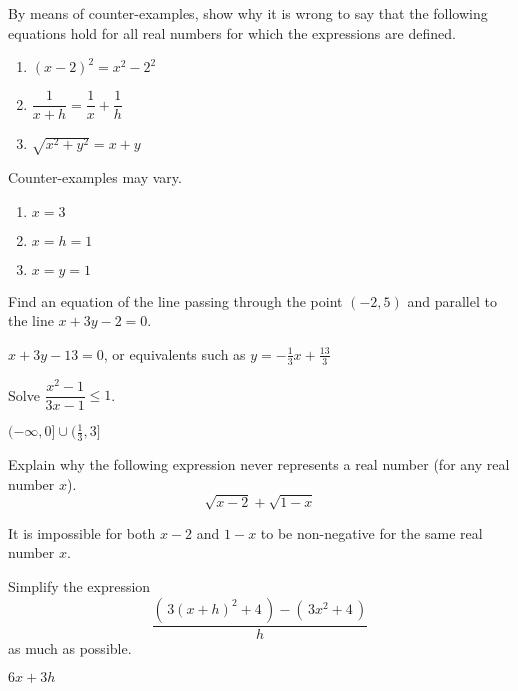 \begin{enumialphparenastyle}
\begin{multicols}{2}
\begin{ex}
By means of counter-examples, show why it is wrong
to say that the following equations hold for all real numbers for which the
expressions are defined.
\begin{enumerate}
		\item	$(x-2)^2=x^2-2^2$
	\item	$\dfrac{1}{x+h}=\dfrac{1}{x}+\dfrac{1}{h}$
	\item	$\sqrt{x^2+y^2}=x+y$
\end{enumerate}
\begin{sol}
Counter-examples may vary.
\begin{enumerate}
	\item	$x=3$
	\item	$x=h=1$
	\item	$x=y=1$
\end{enumerate}
\end{sol}
\end{ex}

\begin{ex}
Find an equation of the line passing through the
point $(-2,5)$ and parallel to the line $x+3y-2=0$.
\begin{sol}
	$x+3y-13=0$, or equivalents such as $y=-\frac{1}{3}x+\frac{13}{3}$
\end{sol}
\end{ex}

\begin{ex}
Solve $\dfrac{x^2-1}{3x-1}\leq 1$.
\begin{sol}
	$(-\infty,0]\cup(\frac{1}{3},3]$
\end{sol}
\end{ex}

\begin{ex}
Explain why the following expression never
represents a real number (for any real \\
number $x$). \\
$$\sqrt{x-2}+\sqrt{1-x}$$
\begin{sol}
	It is impossible for both $x-2$ and $1-x$ to be non-negative
	for the same real number $x$.
\end{sol}
\end{ex}

\begin{ex}
Simplify the expression \\
$$\dfrac{\left( \, 3(x+h)^2+4 \, \right)-\left( \, 3x^2+4 \, \right) }{h}$$ 
 as much as possible.
\begin{sol}
	$6x+3h$
\end{sol}
\end{ex}


\end{multicols}
\end{enumialphparenastyle}
